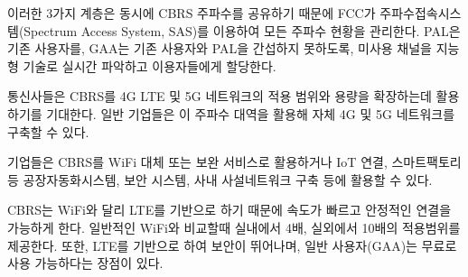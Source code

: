 이러한 3가지 계층은 동시에 CBRS 주파수를 공유하기 때문에 FCC가 주파수접속시스템(Spectrum Access System, SAS)를 이용하여 모든 주파수 현황을 관리한다. PAL은 기존 사용자를, GAA는 기존 사용자와 PAL을 간섭하지 못하도록, 미사용 채널을 지능형 기술로 실시간 파악하고 이용자들에게 할당한다.

통신사들은 CBRS를 4G LTE 및 5G 네트워크의 적용 범위와 용량을 확장하는데 활용하기를 기대한다. 일반 기업들은 이 주파수 대역을 활용해 자체 4G 및 5G 네트워크를 구축할 수 있다.

기업들은 CBRS를 WiFi 대체 또는 보완 서비스로 활용하거나 IoT 연결, 스마트팩토리 등 공장자동화시스템, 보안 시스템, 사내 사설네트워크 구축 등에 활용할 수 있다.

CBRS는 WiFi와 달리 LTE를 기반으로 하기 때문에 속도가 빠르고 안정적인 연결을 가능하게 한다. 일반적인 WiFi와 비교할때 실내에서 4배, 실외에서 10배의 적용범위를 제공한다. 또한, LTE를 기반으로 하여 보안이 뛰어나며, 일반 사용자(GAA)는 무료로 사용 가능하다는 장점이 있다.
        